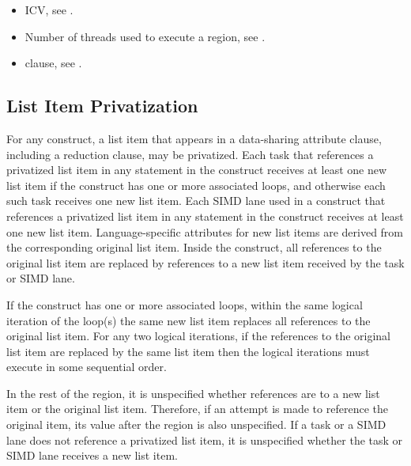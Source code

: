 \crossreferences
\begin{itemize}
\item {} ICV, see
.

\item Number of threads used to execute a  region, see
.

\item {} clause, see
.
\end{itemize}



\subsection{List Item Privatization}
\label{subsec:List Item Privatization}

For any construct, a list item that appears in a data-sharing attribute
clause, including a reduction clause, may be privatized. Each task that
references a privatized list item in any statement in the construct receives
at least one new list item if the construct has one or more associated loops,
and otherwise each such task receives one new list item.  Each SIMD lane used
in a  construct that references a privatized list item in any
statement in the construct receives at least one new list item.
Language-specific attributes for new list items are derived from the
corresponding original list item. Inside the construct, all references to the
original list item are replaced by references to a new list item received by
the task or SIMD lane.  

If the construct has one or more associated loops, within the same logical
iteration of the loop(s) the same new list item replaces all references to the
original list item. For any two logical iterations, if the references to the
original list item are replaced by the same list item then the logical
iterations must execute in some sequential order.

In the rest of the region, it is unspecified whether references are
to a new list item or the original list item. Therefore, if an attempt is made
to reference the original item, its value after the region is also
unspecified. If a task or a SIMD lane does not reference a privatized list
item, it is unspecified whether the task or SIMD lane receives a new list
item.

